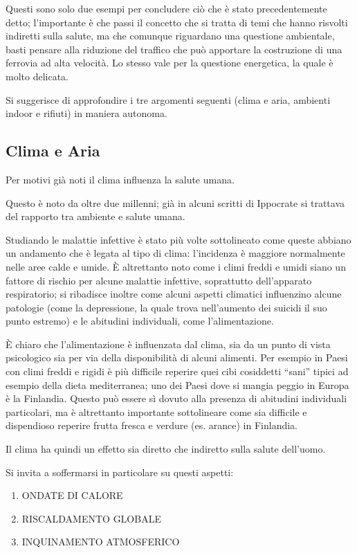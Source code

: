 Questi sono solo due esempi per concludere ciò che è stato
precedentemente detto; l'importante è che passi il concetto che si
tratta di temi che hanno risvolti indiretti sulla salute, ma che
comunque riguardano una questione ambientale, basti pensare alla
riduzione del traffico che può apportare la costruzione di una ferrovia
ad alta velocità. Lo stesso vale per la questione energetica, la quale è
molto delicata.

Si suggerisce di approfondire i tre argomenti seguenti (clima e aria,
ambienti indoor e rifiuti) in maniera autonoma.

\subsection{Clima e Aria}


Per motivi già noti il clima influenza la salute umana.

Questo è noto da oltre due millenni; già in alcuni scritti di Ippocrate
si trattava del rapporto tra ambiente e salute umana.

Studiando le malattie infettive è stato più volte sottolineato come
queste abbiano un andamento che è legata al tipo di clima: l'incidenza è
maggiore normalmente nelle aree calde e umide. È altrettanto noto come i
climi freddi e umidi siano un fattore di rischio per alcune malattie
infettive, soprattutto dell'apparato respiratorio; si ribadisce inoltre
come alcuni aspetti climatici influenzino alcune patologie (come la
depressione, la quale trova nell'aumento dei suicidi il suo punto
estremo) e le abitudini individuali, come l'alimentazione.

È chiaro che l'alimentazione è influenzata dal clima, sia da un punto di
vista psicologico sia per via della disponibilità di alcuni alimenti.
Per esempio in Paesi con climi freddi e rigidi è più difficile reperire
quei cibi cosiddetti ``sani'' tipici ad esempio della dieta
mediterranea; uno dei Paesi dove si mangia peggio in Europa è la
Finlandia. Questo può essere sì dovuto alla presenza di abitudini
individuali particolari, ma è altrettanto importante sottolineare come
sia difficile e dispendioso reperire frutta fresca e verdure (es.
arance) in Finlandia.

Il clima ha quindi un effetto sia diretto che indiretto sulla salute
dell'uomo.

Si invita a soffermarsi in particolare su questi aspetti:

\begin{enumerate}
\item
  ONDATE DI CALORE
\item
  RISCALDAMENTO GLOBALE
\item
  INQUINAMENTO ATMOSFERICO
\end{enumerate}

